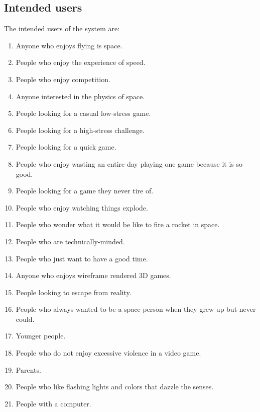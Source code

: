 \subsection*{Intended users}

The intended users of the system are:

\begin{enumerate}

  \item Anyone who enjoys flying is space.

  \item People who enjoy the experience of speed.

  \item People who enjoy competition.

  \item Anyone interested in the physics of space.

  \item People looking for a casual low-stress game.

  \item People looking for a high-stress challenge.

  \item People looking for a quick game.

  \item People who enjoy wasting an entire day playing one game because it is so good.

  \item People looking for a game they never tire of.

  \item People who enjoy watching things explode.

  \item People who wonder what it would be like to fire a rocket in space.

  \item People who are technically-minded.

  \item People who just want to have a good time.

  \item Anyone who enjoys wireframe rendered 3D games.

  \item People looking to escape from reality.

  \item People who always wanted to be a space-person when they grew up but never could.

  \item Younger people.

  \item People who do not enjoy excessive violence in a video game.

  \item Parents.

  \item People who like flashing lights and colors that dazzle the senses.

  \item People with a computer.

\end{enumerate}

